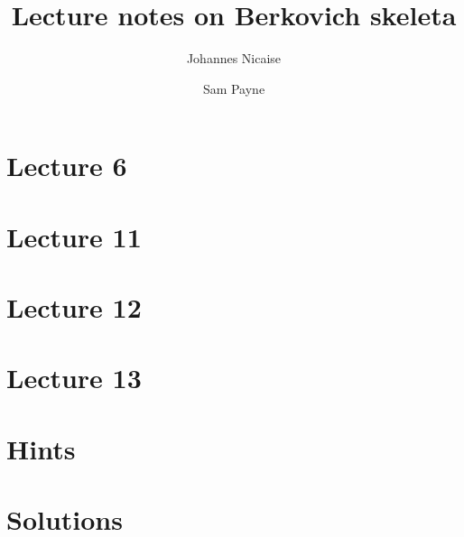 \documentclass[10pt,a4paper,twoside]{article}
\title{Lecture notes on Berkovich skeleta}
\author{Johannes Nicaise \and Sam Payne}
\numberwithin{equation}{section}
\begin{document}
\maketitle

\tableofcontents







\section{Lecture 6}




\section{Lecture 11}
\section{Lecture 12}
\section{Lecture 13}




\cleartoevenpage
\section{Hints}


\cleartoevenpage
\section{Solutions}

\end{document}
